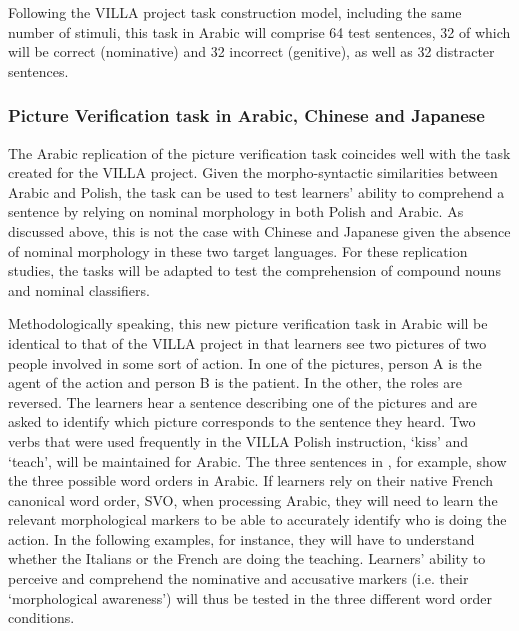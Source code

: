 \documentclass[output=paper,colorlinks,citecolor=brown,modfonts,nonflat]{../langscibook}
\begin{document}
Following the VILLA project task construction model, including the same number of stimuli, this task in Arabic will comprise 64 test sentences, 32 of which will be correct (nominative) and 32 incorrect (genitive), as well as 32 distracter sentences.

\subsubsection{Picture Verification task in Arabic, Chinese and Japanese}\label{sec:watorek:4.2.2}

The Arabic replication of the picture verification task coincides well with the task created for the VILLA project. Given the morpho-syntactic similarities between Arabic and Polish, the task can be used to test learners’ ability to comprehend a sentence by relying on nominal morphology in both Polish and Arabic. As discussed above, this is not the case with Chinese and Japanese given the absence of nominal morphology in these two target languages. For these replication studies, the tasks will be adapted to test the comprehension of compound nouns and nominal classifiers.


\label{sec:watorek:4.2.2.1}

Methodologically speaking, this new picture verification task in Arabic will be identical to that of the VILLA project in that learners see two pictures of two people involved in some sort of action. In one of the pictures, person A is the agent of the action and person B is the patient. In the other, the roles are reversed. The learners hear a sentence describing one of the pictures and are asked to identify which picture corresponds to the sentence they heard. Two verbs that were used frequently in the VILLA Polish instruction, ‘kiss’ and ‘teach’, will be maintained for Arabic. The three sentences in , for example, show the three possible word orders in Arabic. If learners rely on their native French canonical word order, SVO, when processing Arabic, they will need to learn the relevant morphological markers to be able to accurately identify who is doing the action. In the following examples, for instance, they will have to understand whether the Italians or the French are doing the teaching. Learners’ ability to perceive and comprehend the nominative and accusative markers (i.e. their ‘morphological awareness’) will thus be tested in the three different word order conditions.
\end{document}
